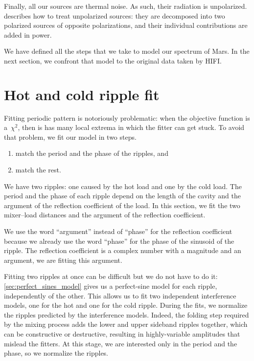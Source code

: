 \begin{refsection}
Finally, all our sources are thermal noise.
As such, their radiation is unpolarized.
 describes how to treat unpolarized sources:
they are decomposed into two polarized sources of opposite polarizations, and their individual contributions are added in power.

We have defined all the steps that we take to model our spectrum of Mars.
In the next section, we confront that model to the original data taken by HIFI.





\FloatBarrier



\section{Hot and cold ripple fit}

Fitting periodic pattern is notoriously problematic:
when the objective function is a~$\chi^2$, then is has many local extrema in which the fitter can get stuck.
To avoid that problem, we fit our model in two steps.
\begin{enumerate}
    \item match the period and the phase of the ripples, and
    \item match the rest.
\end{enumerate}
We have two ripples: one caused by the hot load and one by the cold load.
The period and the phase of each ripple depend on the length of the cavity and the argument of the reflection coefficient of the load.
In this section, we fit the two mixer--load distances and the argument of the reflection coefficient.

We use the word ``argument'' instead of ``phase'' for the reflection coefficient because we already use the word ``phase'' for the phase of the sinusoid of the ripple.
The reflection coefficient is a complex number with a magnitude and an argument, we are fitting this argument.

Fitting two ripples at once can be difficult but we do not have to do it:
\cref{sec:perfect_sines_model} gives us a perfect-sine model for each ripple, independently of the other.
This allows us to fit two independent interference models, one for the hot and one for the cold ripple.
During the fits, we normalize the ripples predicted by the interference models.
Indeed, the folding step required by the mixing process adds the lower and upper sideband ripples together, which can be constructive or destructive, resulting in highly-variable amplitudes that mislead the fitters.
At this stage, we are interested only in the period and the phase, so we normalize the ripples.


\end{refsection}
